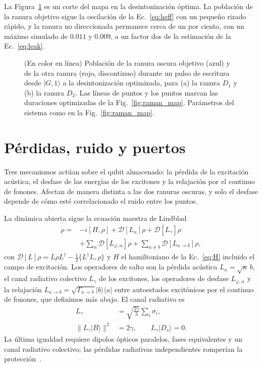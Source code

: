 \documentclass[aps,pra,twocolumn,groupedaddress,amsmath,amssymb,floatfix]{revtex4-2}
\newcommand{\ket}[1]{\lvert #1\rangle}
\newcommand{\bra}[1]{\langle #1\rvert}
\begin{document}
La Figura~\ref{fig:raman_dyn} es un corte del mapa en la desintonizaci\'on \'optima. La poblaci\'on de la ranura objetivo sigue la oscilaci\'on de la Ec.~\eqref{eq:heff} con un peque\~no rizado r\'apido, y la ranura no direccionada permanece cerca de un por ciento, con un m\'aximo simulado de $0.011$ y $0.009$, a un factor dos de la estimaci\'on de la Ec.~\eqref{eq:leak}.

\begin{figure}[t]
\centering
\resizebox{\columnwidth}{!}{}
\caption{(En color en l\'inea) Poblaci\'on de la ranura oscura objetivo (azul) y de la otra ranura (rojo, discontinuo) durante un pulso de escritura desde $\ket{G,1}$ a la desintonizaci\'on optimizada, para (a) la ranura $D_1$ y (b) la ranura $D_2$. Las l\'ineas de puntos y los puntos marcan las duraciones optimizadas de la Fig.~\ref{fig:raman_map}. Par\'ametros del sistema como en la Fig.~\ref{fig:raman_map}.}
\label{fig:raman_dyn}
\end{figure}

\section{P\'erdidas, ruido y puertos}
\label{sec:noise}

Tres mecanismos act\'uan sobre el qubit almacenado: la p\'erdida de la excitaci\'on ac\'ustica, el desfase de las energ\'ias de los excitones y la relajaci\'on por el continuo de fonones. Afectan de manera distinta a las dos ranuras oscuras, y solo el desfase depende de c\'omo est\'e correlacionado el ruido entre los puntos.

La din\'amica abierta sigue la ecuaci\'on maestra de Lindblad
\begin{equation}
\begin{aligned}\dot\rho={}&-i[H,\rho]+\mathcal D[L_\kappa]\rho+\mathcal D[L_\gamma]\rho\\&+\sum_\alpha\mathcal D[L_{\varphi,\alpha}]\rho+\sum_{a\neq b}\mathcal D[L_{a\to b}]\rho,\end{aligned}\label{eq:master}
\end{equation}
con $\mathcal D[L]\rho=L\rho L^\dagger-\tfrac12\{L^\dagger L,\rho\}$ y $H$ el hamiltoniano de la Ec.~\eqref{eq:H} incluido el campo de excitaci\'on. Los operadores de salto son la p\'erdida ac\'ustica $L_\kappa=\sqrt\kappa\,b$, el canal radiativo colectivo $L_\gamma$ de los excitones, los operadores de desfase $L_{\varphi,\alpha}$ y la relajaci\'on $L_{a\to b}=\sqrt{\Gamma_{a\to b}}\ket b\bra a$ entre autoestados excit\'onicos por el continuo de fonones, que definimos m\'as abajo. El canal radiativo es
\begin{align}
L_\gamma&=\sqrt{\frac{2\gamma}{3}}\sum_i\sigma_i,\nonumber\\
\|L_\gamma\ket B\|^2&=2\gamma,\qquad L_\gamma\ket{D_s}=0.\label{eq:radiative}
\end{align}
La \'ultima igualdad requiere dipolos \'opticos paralelos, fases equivalentes y un canal radiativo colectivo; las p\'erdidas radiativas independientes romper\'ian la protecci\'on~\cite{dicke1954,mokhlespour2012,carlson2019}.
\end{document}
